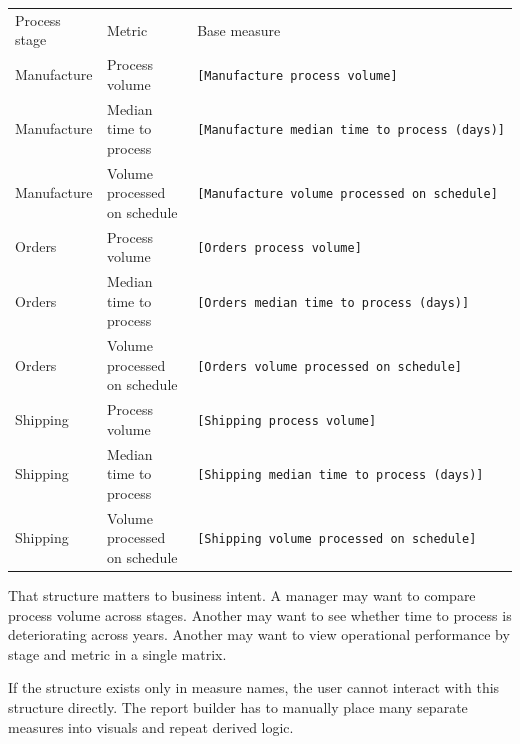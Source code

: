 \documentclass[10pt,openany,10pt]{book}
\newcounter{none}
\let\podeToprule\toprule
\let\podeMidrule\midrule
\let\podeBottomrule\bottomrule
\renewcommand{\toprule}{\arrayrulecolor{pbiGrid}\podeToprule}
\renewcommand{\midrule}{\arrayrulecolor{pbiGrid}\podeMidrule}
\renewcommand{\bottomrule}{\arrayrulecolor{pbiGrid}\podeBottomrule}
\begin{document}
{\def\LTcaptype{none} %
\begin{longtable}[]{@{}
  >{\raggedright\arraybackslash}p{}
  >{\raggedright\arraybackslash}p{}
  >{\raggedright\arraybackslash}p{}@{}}
\toprule\noalign{}
\begin{minipage}[b]{\linewidth}\raggedright
Process stage
\end{minipage} & \begin{minipage}[b]{\linewidth}\raggedright
Metric
\end{minipage} & \begin{minipage}[b]{\linewidth}\raggedright
Base measure
\end{minipage} \\
\midrule\noalign{}
\endhead
\bottomrule\noalign{}
\endlastfoot
Manufacture & Process volume &
\texttt{{[}Manufacture\ process\ volume{]}} \\
Manufacture & Median time to process &
\texttt{{[}Manufacture\ median\ time\ to\ process\ (days){]}} \\
Manufacture & Volume processed on schedule &
\texttt{{[}Manufacture\ volume\ processed\ on\ schedule{]}} \\
Orders & Process volume & \texttt{{[}Orders\ process\ volume{]}} \\
Orders & Median time to process &
\texttt{{[}Orders\ median\ time\ to\ process\ (days){]}} \\
Orders & Volume processed on schedule &
\texttt{{[}Orders\ volume\ processed\ on\ schedule{]}} \\
Shipping & Process volume & \texttt{{[}Shipping\ process\ volume{]}} \\
Shipping & Median time to process &
\texttt{{[}Shipping\ median\ time\ to\ process\ (days){]}} \\
Shipping & Volume processed on schedule &
\texttt{{[}Shipping\ volume\ processed\ on\ schedule{]}} \\
\end{longtable}
}

That structure matters to business intent. A manager may want to compare
process volume across stages. Another may want to see whether time to
process is deteriorating across years. Another may want to view
operational performance by stage and metric in a single matrix.

If the structure exists only in measure names, the user cannot interact
with this structure directly. The report builder has to manually place
many separate measures into visuals and repeat derived logic.
\end{document}
